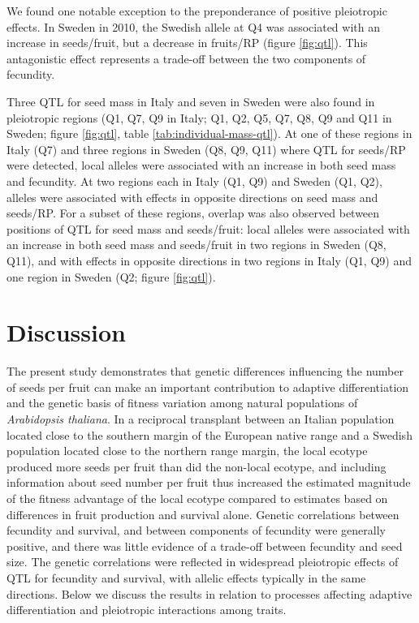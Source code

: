 \documentclass[]{article}
\begin{document}
We found one notable exception to the preponderance of positive pleiotropic effects. In Sweden in 2010, the Swedish allele at Q4 was associated with an increase in seeds/fruit, but a decrease in fruits/RP (figure \ref{fig:qtl}). This antagonistic effect represents a trade-off between the two components of fecundity.

Three QTL for seed mass in Italy and seven in Sweden were also found in pleiotropic regions (Q1, Q7, Q9 in Italy; Q1, Q2, Q5, Q7, Q8, Q9 and Q11 in Sweden; figure \ref{fig:qtl}, table \ref{tab:individual-mass-qtl}). At one of these regions in Italy (Q7) and three regions in Sweden (Q8, Q9, Q11) where QTL for seeds/RP were detected, local alleles were associated with an increase in both seed mass and fecundity. At two regions each in Italy (Q1, Q9) and Sweden (Q1, Q2), alleles were associated with effects in opposite directions on seed mass and seeds/RP. For a subset of these regions, overlap was also observed between positions of QTL for seed mass and seeds/fruit: local alleles were associated with an increase in both seed mass and seeds/fruit in two regions in Sweden (Q8, Q11), and with effects in opposite directions in two regions in Italy (Q1, Q9) and one region in Sweden (Q2; figure \ref{fig:qtl}).

\hypertarget{discussion}{%
\section{Discussion}\label{discussion}}

The present study demonstrates that genetic differences influencing the number of seeds per fruit can make an important contribution to adaptive differentiation and the genetic basis of fitness variation among natural populations of \emph{Arabidopsis thaliana}. In a reciprocal transplant between an Italian population located close to the southern margin of the European native range and a Swedish population located close to the northern range margin, the local ecotype produced more seeds per fruit than did the non-local ecotype, and including information about seed number per fruit thus increased the estimated magnitude of the fitness advantage of the local ecotype compared to estimates based on differences in fruit production and survival alone. Genetic correlations between fecundity and survival, and between components of fecundity were generally positive, and there was little evidence of a trade-off between fecundity and seed size. The genetic correlations were reflected in widespread pleiotropic effects of QTL for fecundity and survival, with allelic effects typically in the same directions. Below we discuss the results in relation to processes affecting adaptive differentiation and pleiotropic interactions among traits.
\end{document}
